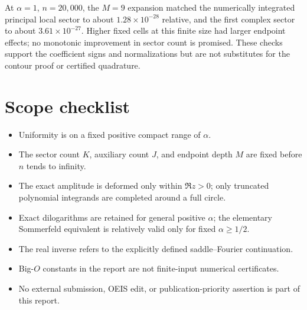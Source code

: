 \documentclass[11pt,letterpaper]{article}
\begin{document}
At $\alpha=1$, $n=20{,}000$, the $M=9$ expansion matched the numerically integrated principal local sector to about $1.28\times10^{-28}$ relative, and the first complex sector to about $3.61\times10^{-27}$. Higher fixed cells at this finite size had larger endpoint effects; no monotonic improvement in sector count is promised. These checks support the coefficient signs and normalizations but are not substitutes for the contour proof or certified quadrature.

\section{Scope checklist}
\begin{itemize}
\item Uniformity is on a fixed positive compact range of $\alpha$.
\item The sector count $K$, auxiliary count $J$, and endpoint depth $M$ are fixed before $n$ tends to infinity.
\item The exact amplitude is deformed only within $\Re z>0$; only truncated polynomial integrands are completed around a full circle.
\item Exact dilogarithms are retained for general positive $\alpha$; the elementary Sommerfeld equivalent is relatively valid only for fixed $\alpha\ge1/2$.
\item The real inverse refers to the explicitly defined saddle--Fourier continuation.
\item Big-$O$ constants in the report are not finite-input numerical certificates.
\item No external submission, OEIS edit, or publication-priority assertion is part of this report.
\end{itemize}
\end{document}
